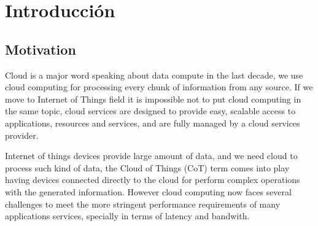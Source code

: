 
\cleardoublepage


\chapter{Introducción}
\label{makereference}



\section{Motivation}
\label{makereference1.1}

Cloud is a major word speaking about data compute in the last decade, we use cloud computing for processing every chunk of information from any source. 
If we move to Internet of Things field it is impossible not to put cloud computing in the same topic, cloud services are designed to provide easy, scalable access to applications, resources and services, and are fully managed by a cloud services provider.~\cite{cloud_def}  

Internet of things devices provide large amount of data, and we need cloud to process such kind of data, the Cloud of Things (CoT) term comes into play having devices connected directly to the cloud for perform complex operations with the generated information.
However cloud computing now faces several challenges to meet the more stringent performance requirements of many applications services, specially in terms of latency and bandwith.~\cite{IEE:Morabito:2017}

